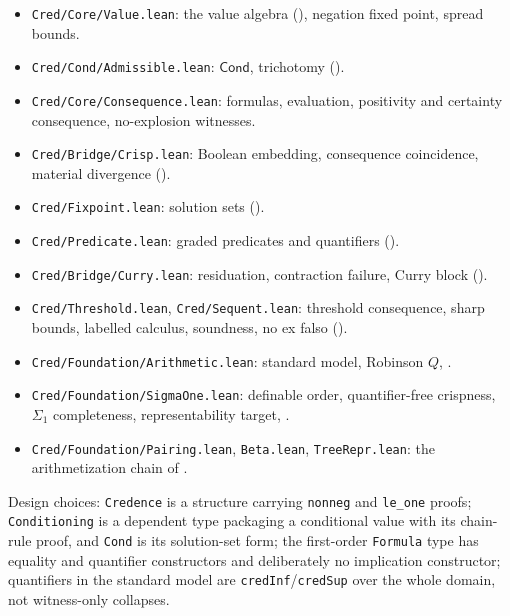 \documentclass[11pt,a4paper]{article}
\newcommand{\Cond}{\mathsf{Cond}}
\begin{document}
\begin{itemize}[nosep]
\item \texttt{Cred/Core/Value.lean}: the value algebra
  (), negation fixed point, spread bounds.
\item \texttt{Cred/Cond/Admissible.lean}: $\Cond$, trichotomy
  ().
\item \texttt{Cred/Core/Consequence.lean}: formulas, evaluation,
  positivity and certainty consequence, no-explosion witnesses.
\item \texttt{Cred/Bridge/Crisp.lean}: Boolean embedding, consequence
  coincidence, material divergence ().
\item \texttt{Cred/Fixpoint.lean}: solution sets
  ().
\item \texttt{Cred/Predicate.lean}: graded predicates and quantifiers
  ().
\item \texttt{Cred/Bridge/Curry.lean}: residuation, contraction
  failure, Curry block ().
\item \texttt{Cred/Threshold.lean}, \texttt{Cred/Sequent.lean}:
  threshold consequence, sharp bounds, labelled calculus, soundness,
  no ex falso ().
\item \texttt{Cred/Foundation/Arithmetic.lean}: standard model,
  Robinson $Q$, .
\item \texttt{Cred/Foundation/SigmaOne.lean}: definable order,
  quantifier-free crispness, $\Sigma_1$ completeness,
  representability target, .
\item \texttt{Cred/Foundation/Pairing.lean},
  \texttt{Beta.lean}, \texttt{TreeRepr.lean}: the arithmetization
  chain of .
\end{itemize}

Design choices: \texttt{Credence} is a structure carrying
\texttt{nonneg} and \texttt{le\_one} proofs; \texttt{Conditioning} is
a dependent type packaging a conditional value with its chain-rule
proof, and \texttt{Cond} is its solution-set form; the first-order
\texttt{Formula} type has equality and quantifier constructors and
deliberately no implication constructor; quantifiers in the standard
model are \texttt{credInf}/\texttt{credSup} over the whole domain,
not witness-only collapses.
\end{document}
